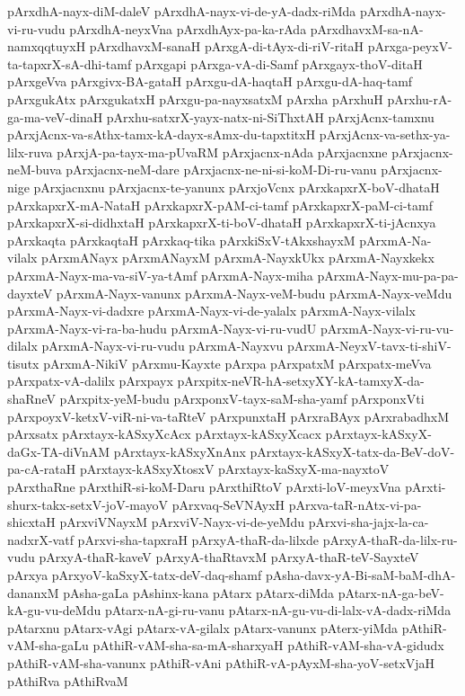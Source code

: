 {pArxdhA-nayx-diM-daleV
pArxdhA-nayx-vi-de-yA-dadx-riMda
pArxdhA-nayx-vi-ru-vudu
pArxdhA-neyxVna
pArxdhAyx-pa-ka-rAda
pArxdhavxM-sa-nA-namxqqtuyxH
pArxdhavxM-sanaH
pArxgA-di-tAyx-di-riV-ritaH
pArxga-peyxV-ta-tapxrX-sA-dhi-tamf
pArxgapi
pArxga-vA-di-Samf
pArxgayx-thoV-ditaH
pArxgeVva
pArxgivx-BA-gataH
pArxgu-dA-haqtaH
pArxgu-dA-haq-tamf
pArxgukAtx
pArxgukatxH
pArxgu-pa-nayxsatxM
pArxha
pArxhuH
pArxhu-rA-ga-ma-veV-dinaH
pArxhu-satxrX-yayx-natx-ni-SiThxtAH
pArxjAcnx-tamxnu
pArxjAcnx-va-sAthx-tamx-kA-dayx-sAmx-du-tapxtitxH
pArxjAcnx-va-sethx-ya-lilx-ruva
pArxjA-pa-tayx-ma-pUvaRM
pArxjacnx-nAda
pArxjacnxne
pArxjacnx-neM-buva
pArxjacnx-neM-dare
pArxjacnx-ne-ni-si-koM-Di-ru-vanu
pArxjacnx-nige
pArxjacnxnu
pArxjacnx-te-yanunx
pArxjoVcnx
pArxkapxrX-boV-dhataH
pArxkapxrX-mA-NataH
pArxkapxrX-pAM-ci-tamf
pArxkapxrX-paM-ci-tamf
pArxkapxrX-si-didhxtaH
pArxkapxrX-ti-boV-dhataH
pArxkapxrX-ti-jAcnxya
pArxkaqta
pArxkaqtaH
pArxkaq-tika
pArxkiSxV-tAkxshayxM
pArxmA-Na-vilalx
pArxmANayx
pArxmANayxM
pArxmA-NayxkUkx
pArxmA-Nayxkekx
pArxmA-Nayx-ma-va-siV-ya-tAmf
pArxmA-Nayx-miha
pArxmA-Nayx-mu-pa-pa-dayxteV
pArxmA-Nayx-vanunx
pArxmA-Nayx-veM-budu
pArxmA-Nayx-veMdu
pArxmA-Nayx-vi-dadxre
pArxmA-Nayx-vi-de-yalalx
pArxmA-Nayx-vilalx
pArxmA-Nayx-vi-ra-ba-hudu
pArxmA-Nayx-vi-ru-vudU
pArxmA-Nayx-vi-ru-vu-dilalx
pArxmA-Nayx-vi-ru-vudu
pArxmA-Nayxvu
pArxmA-NeyxV-tavx-ti-shiV-tisutx
pArxmA-NikiV
pArxmu-Kayxte
pArxpa
pArxpatxM
pArxpatx-meVva
pArxpatx-vA-dalilx
pArxpayx
pArxpitx-neVR-hA-setxyXY-kA-tamxyX-da-shaRneV
pArxpitx-yeM-budu
pArxponxV-tayx-saM-sha-yamf
pArxponxVti
pArxpoyxV-ketxV-viR-ni-va-taRteV
pArxpunxtaH
pArxraBAyx
pArxrabadhxM
pArxsatx
pArxtayx-kASxyXcAcx
pArxtayx-kASxyXcacx
pArxtayx-kASxyX-daGx-TA-diVnAM
pArxtayx-kASxyXnAnx
pArxtayx-kASxyX-tatx-da-BeV-doV-pa-cA-rataH
pArxtayx-kASxyXtosxV
pArxtayx-kaSxyX-ma-nayxtoV
pArxthaRne
pArxthiR-si-koM-Daru
pArxthiRtoV
pArxti-loV-meyxVna
pArxti-shurx-takx-setxV-joV-mayoV
pArxvaq-SeVNAyxH
pArxva-taR-nAtx-vi-pa-shicxtaH
pArxviVNayxM
pArxviV-Nayx-vi-de-yeMdu
pArxvi-sha-jajx-la-ca-nadxrX-vatf
pArxvi-sha-tapxraH
pArxyA-thaR-da-lilxde
pArxyA-thaR-da-lilx-ru-vudu
pArxyA-thaR-kaveV
pArxyA-thaRtavxM
pArxyA-thaR-teV-SayxteV
pArxya
pArxyoV-kaSxyX-tatx-deV-daq-shamf
pAsha-davx-yA-Bi-saM-baM-dhA-dananxM
pAsha-gaLa
pAshinx-kana
pAtarx
pAtarx-diMda
pAtarx-nA-ga-beV-kA-gu-vu-deMdu
pAtarx-nA-gi-ru-vanu
pAtarx-nA-gu-vu-di-lalx-vA-dadx-riMda
pAtarxnu
pAtarx-vAgi
pAtarx-vA-gilalx
pAtarx-vanunx
pAterx-yiMda
pAthiR-vAM-sha-gaLu
pAthiR-vAM-sha-sa-mA-sharxyaH
pAthiR-vAM-sha-vA-gidudx
pAthiR-vAM-sha-vanunx
pAthiR-vAni
pAthiR-vA-pAyxM-sha-yoV-setxVjaH
pAthiRva
pAthiRvaM
}
